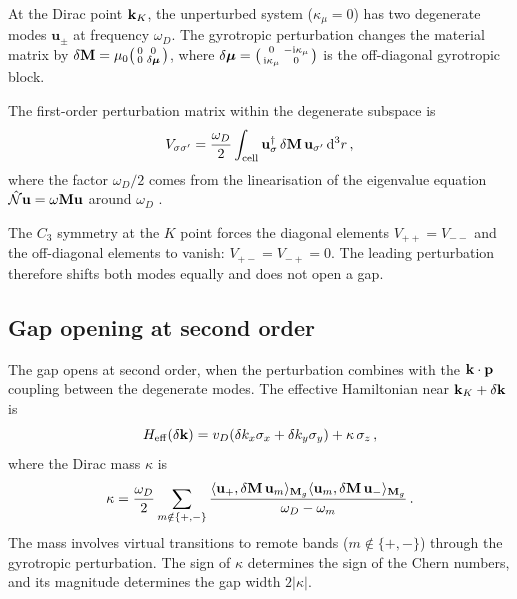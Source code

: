 At the Dirac point $\mathbf{k}_K$, the unperturbed system ($\kappa_\mu=0$)
has two degenerate modes $\mathbf{u}_\pm$ at frequency $\omega_D$.
The gyrotropic perturbation changes the material matrix by
$\delta\mathbf{M}=\mu_0\bigl(\begin{smallmatrix}0&0\\0&\delta\boldsymbol{\mu}
\end{smallmatrix}\bigr)$, where
$\delta\boldsymbol{\mu}=\bigl(\begin{smallmatrix}0&-\mathrm{i}\kappa_\mu\\
\mathrm{i}\kappa_\mu&0\end{smallmatrix}\bigr)$ is the off-diagonal gyrotropic
block.

The first-order perturbation matrix within the degenerate subspace is
\begin{equation}\label{eq:ch7-perturbation-matrix}
  V_{\sigma\sigma'}
  = \frac{\omega_D}{2}\int_{\mathrm{cell}}
  \mathbf{u}_\sigma^\dagger\,\delta\mathbf{M}\,\mathbf{u}_{\sigma'}
  \,\mathrm{d}^3 r\,,
\end{equation}
where the factor $\omega_D/2$ comes from the linearisation of the
eigenvalue equation $\hat{\mathcal{N}}\mathbf{u}=\omega\mathbf{M}\mathbf{u}$ around
$\omega_D$ \cite{haldane2008possible,gangaraj2016berry}.

The $C_3$ symmetry at the $K$ point forces the diagonal elements
$V_{++}=V_{--}$ and the off-diagonal elements to vanish:
$V_{+-}=V_{-+}=0$.  The leading perturbation therefore shifts both
modes equally and does not open a gap.

\subsection{Gap opening at second order}
\label{sec:ch7-second-order}

The gap opens at second order, when the perturbation combines with the
$\mathbf{k}\cdot\mathbf{p}$ coupling between the degenerate modes.  The
effective Hamiltonian near $\mathbf{k}_K+\delta\mathbf{k}$ is
\begin{equation}\label{eq:ch7-effective-H-full}
  H_{\mathrm{eff}}(\delta\mathbf{k})
  = v_D(\delta k_x\sigma_x+\delta k_y\sigma_y)
  + \kappa\,\sigma_z\,,
\end{equation}
where the Dirac mass $\kappa$ is
\begin{equation}\label{eq:ch7-dirac-mass}
  \kappa = \frac{\omega_D}{2}\sum_{m\notin\{+,-\}}
  \frac{\langle \mathbf{u}_+ , \delta\mathbf{M}\,\mathbf{u}_m \rangle_{\mathbf{M}_g}
  \langle \mathbf{u}_m , \delta\mathbf{M}\,\mathbf{u}_- \rangle_{\mathbf{M}_g}}
  {\omega_D-\omega_m}\,.
\end{equation}
The mass involves virtual transitions to remote bands ($m\notin\{+,-\}$)
through the gyrotropic perturbation.  The sign of $\kappa$ determines
the sign of the Chern numbers, and its magnitude determines the gap
width $2|\kappa|$.

